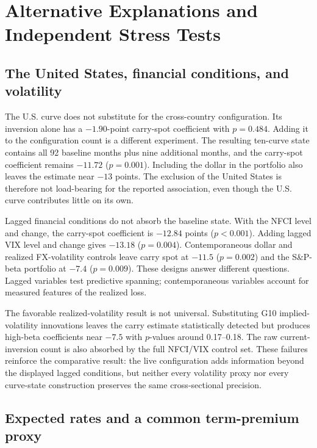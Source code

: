 \section{Alternative Explanations and Independent Stress Tests}
\label{sec:robustness_limits}

\subsection{The United States, financial conditions, and volatility}

The U.S. curve does not substitute for the cross-country configuration. Its inversion alone has a $-1.90$-point carry-spot coefficient with $p=0.484$. Adding it to the configuration count is a different experiment. The resulting ten-curve state contains all 92 baseline months plus nine additional months, and the carry-spot coefficient remains $-11.72$ ($p=0.001$). Including the dollar in the portfolio also leaves the estimate near $-13$ points. The exclusion of the United States is therefore not load-bearing for the reported association, even though the U.S. curve contributes little on its own.


Lagged financial conditions do not absorb the baseline state. With the NFCI level and change, the carry-spot coefficient is $-12.84$ points ($p<0.001$). Adding lagged VIX level and change gives $-13.18$ ($p=0.004$). Contemporaneous dollar and realized FX-volatility controls leave carry spot at $-11.5$ ($p=0.002$) and the S\&P-beta portfolio at $-7.4$ ($p=0.009$). These designs answer different questions. Lagged variables test predictive spanning; contemporaneous variables account for measured features of the realized loss.

The favorable realized-volatility result is not universal. Substituting G10 implied-volatility innovations leaves the carry estimate statistically detected but produces high-beta coefficients near $-7.5$ with $p$-values around 0.17--0.18. The raw current-inversion count is also absorbed by the full NFCI/VIX control set. These failures reinforce the comparative result: the live configuration adds information beyond the displayed lagged conditions, but neither every volatility proxy nor every curve-state construction preserves the same cross-sectional precision.

\subsection{Expected rates and a common term-premium proxy}

